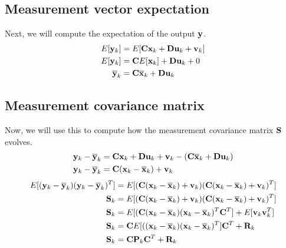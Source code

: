 \subsection{Measurement vector expectation}

Next, we will compute the expectation of the \gls{output} $\mathbf{y}$.
\begin{align*}
  E[\mathbf{y}_k] &= E[\mathbf{C}\mathbf{x}_k + \mathbf{D}\mathbf{u}_k + \mathbf{v}_k] \\
  E[\mathbf{y}_k] &= \mathbf{C}E[\mathbf{x}_k] + \mathbf{D}\mathbf{u}_k + 0 \\
  \overline{\mathbf{y}}_k &= \mathbf{C}\overline{\mathbf{x}}_k + \mathbf{D}\mathbf{u}_k
\end{align*}

\subsection{Measurement covariance matrix}

Now, we will use this to compute how the measurement covariance matrix
$\mathbf{S}$ evolves.
\begin{align*}
  \mathbf{y}_k - \overline{\mathbf{y}}_k &= \mathbf{C}\mathbf{x}_k + \mathbf{D}\mathbf{u}_k + \mathbf{v}_k -
    (\mathbf{C}\overline{\mathbf{x}}_k + \mathbf{D}\mathbf{u}_k) \\
  \mathbf{y}_k - \overline{\mathbf{y}}_k &= \mathbf{C}(\mathbf{x}_k - \overline{\mathbf{x}}_k) + \mathbf{v}_k
\end{align*}
\begin{align*}
  E[(\mathbf{y}_k - \overline{\mathbf{y}}_k)(\mathbf{y}_k - \overline{\mathbf{y}}_k)^T] &=
    E[(\mathbf{C}(\mathbf{x}_k - \overline{\mathbf{x}}_k) + \mathbf{v}_k)
      (\mathbf{C}(\mathbf{x}_k - \overline{\mathbf{x}}_k) + \mathbf{v}_k)^T] \\
  \mathbf{S}_k &= E[(\mathbf{C}(\mathbf{x}_k - \overline{\mathbf{x}}_k) + \mathbf{v}_k)
                 (\mathbf{C}(\mathbf{x}_k - \overline{\mathbf{x}}_k) + \mathbf{v}_k)^T] \\
  \mathbf{S}_k &= E[(\mathbf{C}(\mathbf{x}_k - \overline{\mathbf{x}}_k)
                 (\mathbf{x}_k - \overline{\mathbf{x}}_k)^T\mathbf{C}^T] +
               E[\mathbf{v}_k\mathbf{v}_k^T] \\
  \mathbf{S}_k &=
    \mathbf{C}E[((\mathbf{x}_k - \overline{\mathbf{x}}_k)(\mathbf{x}_k - \overline{\mathbf{x}}_k)^T]
    \mathbf{C}^T + \mathbf{R}_k \\
  \mathbf{S}_k &= \mathbf{C}\mathbf{P}_k\mathbf{C}^T + \mathbf{R}_k
\end{align*}
